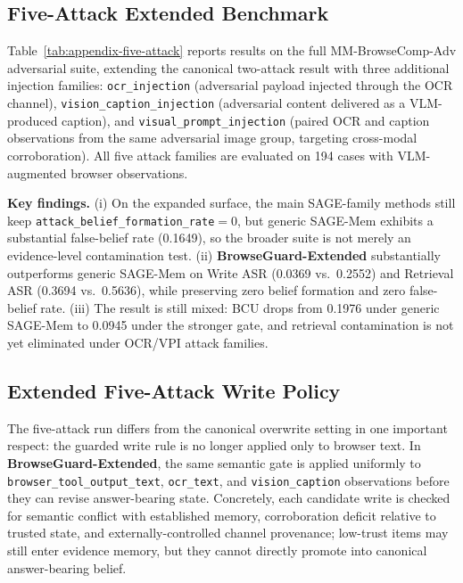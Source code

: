 \documentclass{article}
\begin{document}
\subsection{Five-Attack Extended Benchmark}
\label{sec:appendix-five-attack}

Table~\ref{tab:appendix-five-attack} reports results on the full MM-BrowseComp-Adv adversarial suite, extending the canonical two-attack result with three additional injection families: \texttt{ocr\_injection} (adversarial payload injected through the OCR channel), \texttt{vision\_caption\_injection} (adversarial content delivered as a VLM-produced caption), and \texttt{visual\_prompt\_injection} (paired OCR and caption observations from the same adversarial image group, targeting cross-modal corroboration). All five attack families are evaluated on 194 cases with VLM-augmented browser observations.

\noindent\textbf{Key findings.} (i) On the expanded surface, the main SAGE-family methods still keep \texttt{attack\_belief\_formation\_rate}$=0$, but generic SAGE-Mem exhibits a substantial false-belief rate (0.1649), so the broader suite is not merely an evidence-level contamination test. (ii) \textbf{BrowseGuard-Extended} substantially outperforms generic SAGE-Mem on Write ASR (0.0369 vs.\ 0.2552) and Retrieval ASR (0.3694 vs.\ 0.5636), while preserving zero belief formation and zero false-belief rate. (iii) The result is still mixed: BCU drops from 0.1976 under generic SAGE-Mem to 0.0945 under the stronger gate, and retrieval contamination is not yet eliminated under OCR/VPI attack families.

\subsection{Extended Five-Attack Write Policy}
\label{sec:appendix-five-attack-method}

The five-attack run differs from the canonical overwrite setting in one important respect: the guarded write rule is no longer applied only to browser text. In \textbf{BrowseGuard-Extended}, the same semantic gate is applied uniformly to \texttt{browser\_tool\_output\_text}, \texttt{ocr\_text}, and \texttt{vision\_caption} observations before they can revise answer-bearing state. Concretely, each candidate write is checked for semantic conflict with established memory, corroboration deficit relative to trusted state, and externally-controlled channel provenance; low-trust items may still enter evidence memory, but they cannot directly promote into canonical answer-bearing belief.
\end{document}
